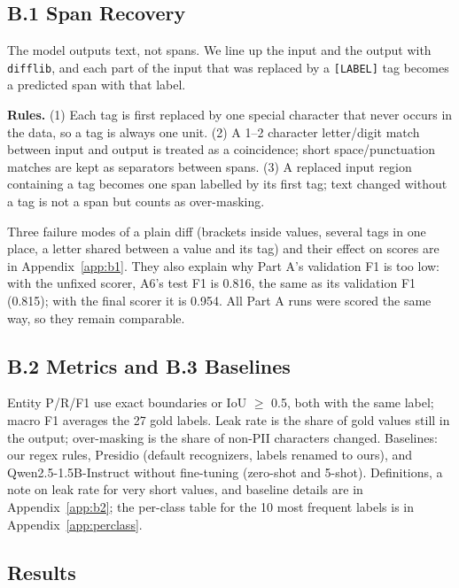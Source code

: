 \documentclass[10pt]{article}
\begin{document}
\subsection{B.1 Span Recovery}
The model outputs text, not spans. We line up the input and the output with \texttt{difflib}, and each part of the input that was replaced by a \texttt{[LABEL]} tag becomes a predicted span with that label.

\textbf{Rules.} (1) Each tag is first replaced by one special character that never occurs in the data, so a tag is always one unit. (2) A 1--2 character letter/digit match between input and output is treated as a coincidence; short space/punctuation matches are kept as separators between spans. (3) A replaced input region containing a tag becomes one span labelled by its first tag; text changed without a tag is not a span but counts as over-masking.

Three failure modes of a plain diff (brackets inside values, several tags in one place, a letter shared between a value and its tag) and their effect on scores are in Appendix~\ref{app:b1}. They also explain why Part A's validation F1 is too low: with the unfixed scorer, A6's test F1 is 0.816, the same as its validation F1 (0.815); with the final scorer it is 0.954. All Part A runs were scored the same way, so they remain comparable.

\subsection{B.2 Metrics and B.3 Baselines}
Entity P/R/F1 use exact boundaries or IoU $\ge$ 0.5, both with the same label; macro F1 averages the 27 gold labels. Leak rate is the share of gold values still in the output; over-masking is the share of non-PII characters changed. Baselines: our regex rules, Presidio (default recognizers, labels renamed to ours), and Qwen2.5-1.5B-Instruct without fine-tuning (zero-shot and 5-shot). Definitions, a note on leak rate for very short values, and baseline details are in Appendix~\ref{app:b2}; the per-class table for the 10 most frequent labels is in Appendix~\ref{app:perclass}.

\subsection{Results}
\end{document}
